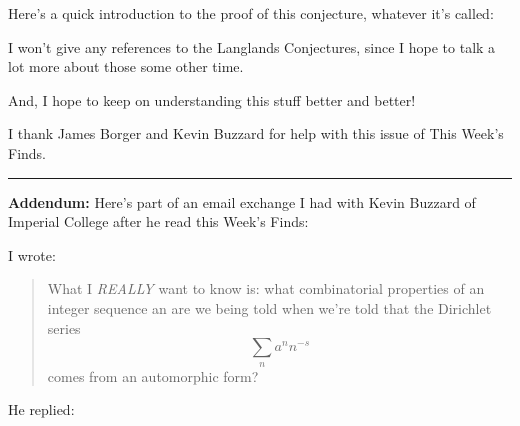 \documentclass{article}
\def\tightlist{}
\renewcommand{\texttt}[1]{%
  \begingroup
  \ttfamily
  \begingroup\lccode`~=`/\lowercase{\endgroup\def~}{/\discretionary{}{}{}}%
  \begingroup\lccode`~=`[\lowercase{\endgroup\def~}{[\discretionary{}{}{}}%
  \begingroup\lccode`~=`.\lowercase{\endgroup\def~}{.\discretionary{}{}{}}%
  \catcode`/=\active\catcode`[=\active\catcode`.=\active
  \scantokens{#1\noexpand}%
  \endgroup
}
\begin{document}
Here's a quick introduction to the proof of this conjecture, whatever
it's called:


I won't give any references to the Langlands Conjectures, since I hope
to talk a lot more about those some other time.

And, I hope to keep on understanding this stuff better and better!

I thank James Borger and Kevin Buzzard for help with this issue of This
Week's Finds.

\begin{center}\rule{0.5\linewidth}{0.5pt}\end{center}

\textbf{Addendum:} Here's part of an email exchange I had with Kevin
Buzzard of Imperial College after he read this Week's Finds:

I wrote:

\begin{quote}
What I \emph{REALLY} want to know is: what combinatorial properties of
an integer sequence an are we being told when we're told that the
Dirichlet series \[\sum_n a^n n^{-s}\] comes from an automorphic form?
\end{quote}

He replied:
\end{document}
